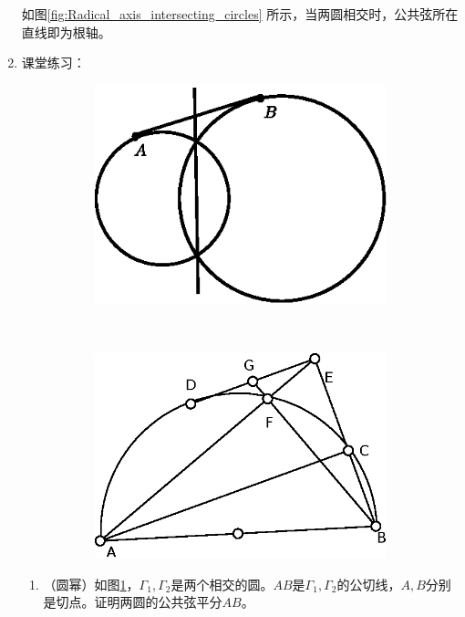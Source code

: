 \documentclass[12pt]{article}
\begin{document}
\begin{enumerate}
如图\ref{fig:Radical_axis_intersecting_circles} 所示，当两圆相交时，公共弦所在直线即为根轴。

\item 
课堂练习：
    \begin{figure}[!ht]
    \centering
    \begin{subfigure}[b]{0.45\textwidth}
    \includegraphics[width=\textwidth]{second_1.eps}
    \caption{}\label{fig:second_1}
    \end{subfigure}~
    \begin{subfigure}[b]{0.45\textwidth}
    \includegraphics[width=\textwidth]{second_2.eps}
    \caption{}\label{fig:second_2}
    \end{subfigure}
    \caption{}
    \end{figure}
\begin{enumerate}[label=(\alph*)]
\item （圆幂）如图\ref{fig:second_1}，$\Gamma_1,\Gamma_2$是两个相交的圆。$AB$是$\Gamma_1,\Gamma_2$的公切线，$A,B$分别是切点。证明两圆的公共弦平分$AB$。



\end{enumerate}
\end{enumerate}
\end{document}
